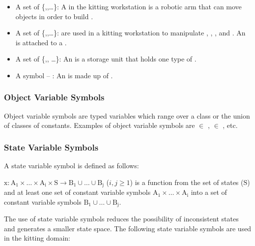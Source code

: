 \begin{itemize}
\item A set of  \{,,\ldots\}: A  in the kitting workstation is a robotic arm that can move objects in order to build .

\item A set of  \{,,\ldots\}:  are used in a kitting workstation to manipulate , , , and . An  is attached to a .

\item A set of   \{,, \ldots\}: An  is a storage unit that holds one type of .

\item A symbol  -- : An  is made up of .
\end{itemize}

\subsubsection{Object Variable Symbols}
Object variable symbols are typed variables which range over a class or the union of classes of constants. Examples of object variable symbols are  $\in$ ,  $\in$ , etc.

\subsubsection{State Variable Symbols}
\label{subsubsect:State_Variable_Symbols}
A state variable symbol is defined as follows:
\begin{defn}
$\mathrm{x: A_1\times \dots\times A_i\times S\rightarrow B_1\cup\dots\cup B_j}$ ($i, j\geq 1$) is a function from the set of states ($\mathrm{S}$) and at least one set of constant variable symbols $\mathrm{A_1\times \dots\times A_i}$ into a set of constant variable symbols $\mathrm{B_1\cup\dots\cup B_j}$.
 \end{defn}

The use of state variable symbols reduces the possibility of inconsistent states and generates a smaller state space. The following state variable symbols are used in the kitting domain:

